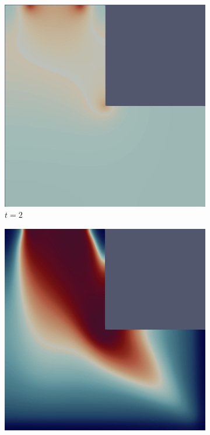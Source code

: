\begin{figure}[H]
    \centering
    \caption{$L$-shape with a Sink: Filtered Distribution}
    \begin{subfigure}{.4\textwidth}
        \includegraphics[width=\textwidth]{imgs/LShape/first.png}
        \caption{$t = 2$}
    \end{subfigure}
    \begin{subfigure}{.4\textwidth}
        \includegraphics[width=\textwidth]{imgs/LShape/second.png}

\end{subfigure}
\end{figure}
